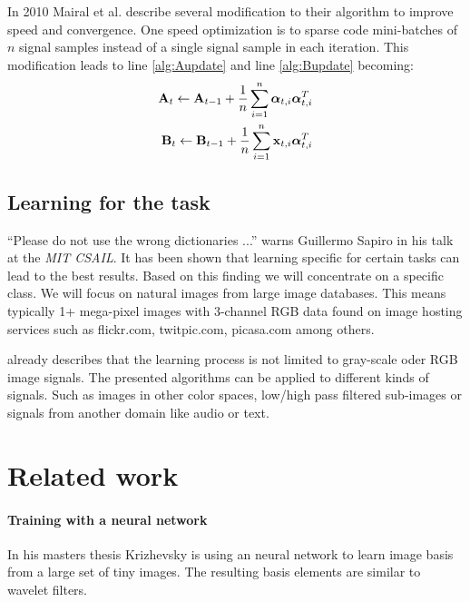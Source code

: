 In 2010 Mairal et al. \cite{Mairal2010} describe several modification to
their algorithm to improve speed and convergence. One speed optimization is to
sparse code mini-batches of $n$ signal samples instead of a single signal sample
in each iteration. This modification leads to line \ref{alg:Aupdate} and line
\ref{alg:Bupdate}
becoming:
\begin{align*}
\boldsymbol{\mathrm{A}}_t \gets \boldsymbol{\mathrm{A}}_{t-1} +
\frac{1}{n}\sum_{i=1}^{n}\boldsymbol{\mathrm{\alpha}}_{t,i}\boldsymbol{\mathrm{\alpha}}_{t,i}^T\\
\boldsymbol{\mathrm{B}}_t \gets \boldsymbol{\mathrm{B}}_{t-1} +
\frac{1}{n}\sum_{i=1}^{n}\boldsymbol{\mathrm{x}}_{t,i}\boldsymbol{\mathrm{\alpha}}_{t,i}^T
\end{align*}

\subsection{Learning for the task}
\label{sec:learnForTheTask}
``Please do not use the wrong dictionaries ...''
warns Guillermo Sapiro in his talk at the \emph{MIT CSAIL}.
It has been shown that learning specific for certain tasks can lead to the
best results. Based on this finding we will concentrate on a
specific class. We will focus on natural images from large image databases.
This means typically 1+ mega-pixel images with 3-channel RGB data found on image
hosting services such as flickr.com, twitpic.com, picasa.com among others.

 already describes that the learning
process is not limited to gray-scale oder RGB image signals. The presented
algorithms can be applied to different kinds of signals. Such as images in
other color spaces, low/high pass filtered sub-images or signals from another
domain like audio or text. 


\section{Related work}
\label{sec:related_dictionarie}


\paragraph{Training with a neural network} In his masters thesis 
Krizhevsky \cite{Krizhevsky2009} is using an neural network to learn image
basis from a large set of tiny images. The resulting basis elements are similar
to wavelet filters.

